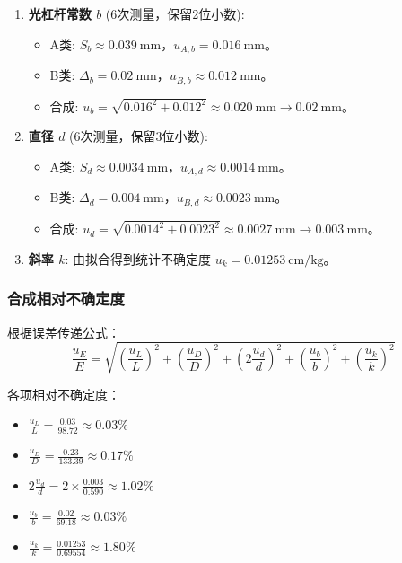 \documentclass{../../templates/Report}%
\begin{document}
\begin{fullreportonly}
\begin{enumerate}
        \item \textbf{光杠杆常数 $b$} (6次测量，保留2位小数):
              \begin{itemize}
                  \item A类: $S_b \approx \SI{0.039}{\milli\meter}$，$u_{A,b} = \SI{0.016}{\milli\meter}$。
                  \item B类: $\Delta_b = \SI{0.02}{\milli\meter}$，$u_{B,b} \approx \SI{0.012}{\milli\meter}$。
                  \item 合成: $u_b = \sqrt{0.016^2 + 0.012^2} \approx \SI{0.020}{\milli\meter} \rightarrow \SI{0.02}{\milli\meter}$。
              \end{itemize}

        \item \textbf{直径 $d$} (6次测量，保留3位小数):
              \begin{itemize}
                  \item A类: $S_d \approx \SI{0.0034}{\milli\meter}$，$u_{A,d} \approx \SI{0.0014}{\milli\meter}$。
                  \item B类: $\Delta_d = \SI{0.004}{\milli\meter}$，$u_{B,d} \approx \SI{0.0023}{\milli\meter}$。
                  \item 合成: $u_d = \sqrt{0.0014^2 + 0.0023^2} \approx \SI{0.0027}{\milli\meter} \rightarrow \SI{0.003}{\milli\meter}$。
              \end{itemize}

        \item \textbf{斜率 $k$}:
              由拟合得到统计不确定度 $u_k = \SI{0.01253}{\centi\meter\per\kilo\gram}$。
    \end{enumerate}

    \subsubsection{合成相对不确定度}
    根据误差传递公式：
    $$ \frac{u_E}{E} = \sqrt{\left(\frac{u_L}{L}\right)^2 + \left(\frac{u_D}{D}\right)^2 + \left(2\frac{u_d}{d}\right)^2 + \left(\frac{u_b}{b}\right)^2 + \left(\frac{u_k}{k}\right)^2} $$

    各项相对不确定度：
    \begin{itemize}
        \item $\frac{u_L}{L} = \frac{0.03}{98.72} \approx 0.03\%$
        \item $\frac{u_D}{D} = \frac{0.23}{133.39} \approx 0.17\%$
        \item $2\frac{u_d}{d} = 2 \times \frac{0.003}{0.590} \approx 1.02\%$
        \item $\frac{u_b}{b} = \frac{0.02}{69.18} \approx 0.03\%$
        \item $\frac{u_k}{k} = \frac{0.01253}{0.69554} \approx 1.80\%$
    \end{itemize}


\end{fullreportonly}
\end{document}
